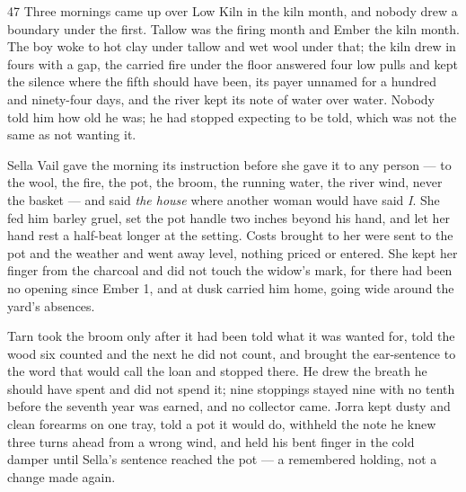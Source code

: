 
\scenebreak


\scenebreak


\scenebreak

\CRtailpiece
\begin{CRchronicle}{47}
Three mornings came up over Low Kiln in the kiln month, and nobody drew a boundary under the first. Tallow was the firing month and Ember the kiln month. The boy woke to hot clay under tallow and wet wool under that; the kiln drew in fours with a gap, the carried fire under the floor answered four low pulls and kept the silence where the fifth should have been, its payer unnamed for a hundred and ninety-four days, and the river kept its note of water over water. Nobody told him how old he was; he had stopped expecting to be told, which was not the same as not wanting it.

Sella Vail gave the morning its instruction before she gave it to any person --- to the wool, the fire, the pot, the broom, the running water, the river wind, never the basket --- and said \emph{the house} where another woman would have said \emph{I}. She fed him barley gruel, set the pot handle two inches beyond his hand, and let her hand rest a half-beat longer at the setting. Costs brought to her were sent to the pot and the weather and went away level, nothing priced or entered. She kept her finger from the charcoal and did not touch the widow’s mark, for there had been no opening since Ember 1, and at dusk carried him home, going wide around the yard’s absences.

Tarn took the broom only after it had been told what it was wanted for, told the wood six counted and the next he did not count, and brought the ear-sentence to the word that would call the loan and stopped there. He drew the breath he should have spent and did not spend it; nine stoppings stayed nine with no tenth before the seventh year was earned, and no collector came. Jorra kept dusty and clean forearms on one tray, told a pot it would do, withheld the note he knew three turns ahead from a wrong wind, and held his bent finger in the cold damper until Sella’s sentence reached the pot --- a remembered holding, not a change made again.


\end{CRchronicle}
